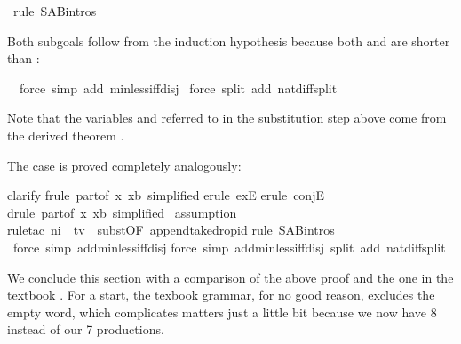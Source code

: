 \begin{isabellebody}
\ rule\ S{\isacharunderscore}A{\isacharunderscore}B{\isachardot}intros{\isacharparenright}%
\begin{isamarkuptxt}%
\noindent
Both subgoals follow from the induction hypothesis because both  and  are shorter than :%
\end{isamarkuptxt}%
\ \ force\ simp\ add{\isacharcolon}\ min{\isacharunderscore}less{\isacharunderscore}iff{\isacharunderscore}disj{\isacharparenright}\isanewline
\ force\ split\ add{\isacharcolon}\ nat{\isacharunderscore}diff{\isacharunderscore}split{\isacharparenright}%
\begin{isamarkuptxt}%
\noindent
Note that the variables  and  referred to in the
substitution step above come from the derived theorem .

The case  is proved completely analogously:%
\end{isamarkuptxt}%
clarify{\isacharparenright}\isanewline
{}frule\ part{}{\isacharbrackleft}of\ {\isachardoublequote}{\isasymlambda}x{\isachardot}\ x{\isacharequal}b{\isachardoublequote}{\isacharcomma}\ simplified{\isacharbrackright}{\isacharparenright}\isanewline
{}erule\ exE{\isacharparenright}\isanewline
{}erule\ conjE{\isacharparenright}\isanewline
{}drule\ part{}{\isacharbrackleft}of\ {\isachardoublequote}{\isasymlambda}x{\isachardot}\ x{\isacharequal}b{\isachardoublequote}{\isacharcomma}\ simplified{\isacharbrackright}{\isacharparenright}\isanewline
\ assumption{\isacharparenright}\isanewline
{}rule{\isacharunderscore}tac\ n{}{\isacharequal}i\ \ t{\isacharequal}v\ \ subst{\isacharbrackleft}OF\ append{\isacharunderscore}take{\isacharunderscore}drop{\isacharunderscore}id{\isacharbrackright}{\isacharparenright}\isanewline
{}rule\ S{\isacharunderscore}A{\isacharunderscore}B{\isachardot}intros{\isacharparenright}\isanewline
\ force\ simp\ add{\isacharcolon}min{\isacharunderscore}less{\isacharunderscore}iff{\isacharunderscore}disj{\isacharparenright}\isanewline
{}force\ simp\ add{\isacharcolon}min{\isacharunderscore}less{\isacharunderscore}iff{\isacharunderscore}disj\ split\ add{\isacharcolon}\ nat{\isacharunderscore}diff{\isacharunderscore}split{\isacharparenright}%
\begin{isamarkuptext}%
We conclude this section with a comparison of the above proof and the one
in the textbook \cite[p.\ 81]{HopcroftUllman}. For a start, the texbook
grammar, for no good reason, excludes the empty word, which complicates
matters just a little bit because we now have 8 instead of our 7 productions.


\end{isamarkuptext}
\end{isabellebody}
